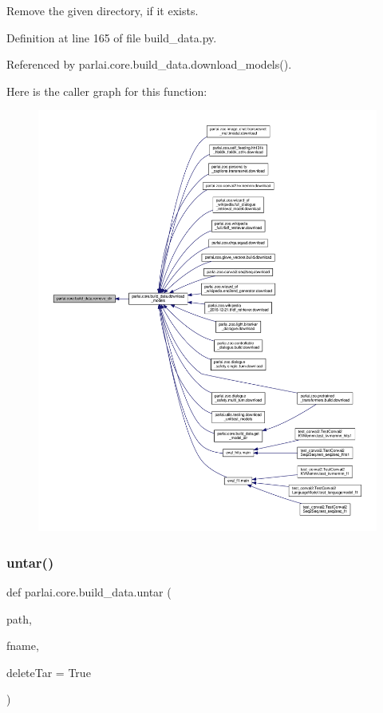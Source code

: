 \begin{DoxyVerb}Remove the given directory, if it exists.\end{DoxyVerb}
 

Definition at line 165 of file build\+\_\+data.\+py.



Referenced by parlai.\+core.\+build\+\_\+data.\+download\+\_\+models().

Here is the caller graph for this function\+:
\nopagebreak
\begin{figure}[H]
\begin{center}
\leavevmode
\includegraphics[width=350pt]{namespaceparlai_1_1core_1_1build__data_a24ab3b7e68e41adf774df058d330ff33_icgraph}
\end{center}
\end{figure}
\mbox{\label{namespaceparlai_1_1core_1_1build__data_a4d33f97932682a8513904022d852f3cf}} 
\subsubsection{\texorpdfstring{untar()}{untar()}}
{\footnotesize\ttfamily def parlai.\+core.\+build\+\_\+data.\+untar (\begin{DoxyParamCaption}\item[{}]{path,  }\item[{}]{fname,  }\item[{}]{delete\+Tar = {\ttfamily True} }\end{DoxyParamCaption})}

